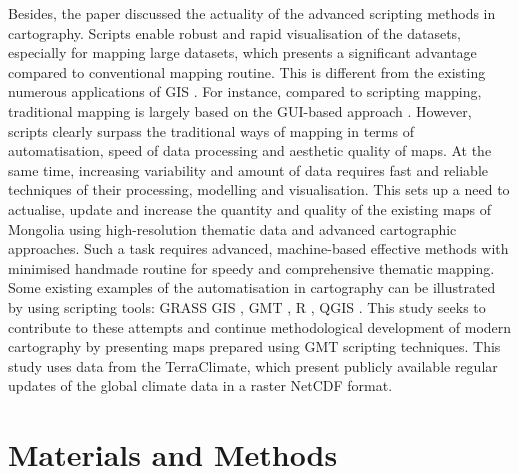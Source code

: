 \documentclass[geosciences,article,submit,pdftex,moreauthors]{Definitions/mdpi}
\begin{document}
Besides, the paper discussed the actuality of the advanced scripting methods in cartography. Scripts enable robust and rapid visualisation of the datasets, especially for mapping large datasets, which presents a significant advantage compared to conventional mapping routine. This is different from the existing numerous applications of GIS \cite{FAN201696,TSUTSUMIDA2015196,Lemenkova2020c,Amarsaikhan,NAKAYAMA2021109404,Lemenkova2020d,PARK2019103630,OSULLIVAN2019101979}. For instance, compared to scripting mapping, traditional mapping is largely based on the GUI-based approach \cite{Tuvshin,Lemenkova2020e,Lemenkova2021f,HOLGUIN2018137}. However, scripts clearly surpass the traditional ways of mapping in terms of automatisation, speed of data processing and aesthetic quality of maps. At the same time, increasing variability and amount of data requires fast and reliable techniques of their processing, modelling and visualisation. This sets up a need to actualise, update and increase the quantity and quality of the existing maps of Mongolia using high-resolution thematic data and advanced cartographic approaches. Such a task requires advanced, machine-based effective methods with minimised handmade routine for speedy and comprehensive thematic mapping. Some existing examples of the automatisation in cartography can be illustrated by using scripting tools: GRASS GIS \cite{FRIGERI20111265,Lemenkova2020f}, GMT \cite{5369602,Lemenkova2021g,BECKER20051075,Lemenkova2021h,OKUBO200459}, R \cite{Tserenpurev,Lemenkova2019b}, QGIS \cite{FANG202031,Lemenkova2020i}. This study seeks to contribute to these attempts and continue methodological development of modern cartography by presenting maps prepared using GMT scripting techniques. This study uses data from the TerraClimate, which present publicly available regular updates of the global climate data in a raster NetCDF format. 

\section{Materials and Methods}
\end{document}
